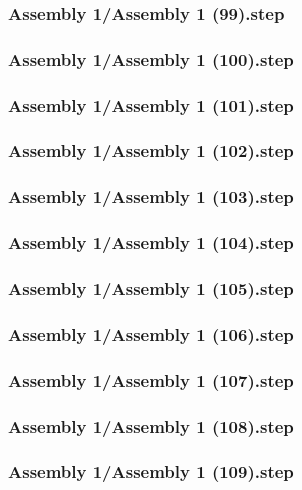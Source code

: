 \documentclass[a4paper,12pt]{article}
\begin{document}
\begin{lstlising}[language=C++]
\subsubsection{Assembly 1/Assembly 1 (99).step}

\subsubsection{Assembly 1/Assembly 1 (100).step}

\subsubsection{Assembly 1/Assembly 1 (101).step}

\subsubsection{Assembly 1/Assembly 1 (102).step}

\subsubsection{Assembly 1/Assembly 1 (103).step}

\subsubsection{Assembly 1/Assembly 1 (104).step}

\subsubsection{Assembly 1/Assembly 1 (105).step}

\subsubsection{Assembly 1/Assembly 1 (106).step}

\subsubsection{Assembly 1/Assembly 1 (107).step}

\subsubsection{Assembly 1/Assembly 1 (108).step}

\subsubsection{Assembly 1/Assembly 1 (109).step}


\end{lstlising}
\end{document}
